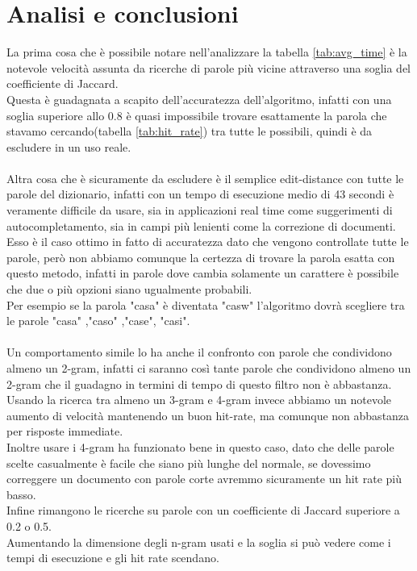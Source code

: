 \documentclass[]{article}
\begin{document}
\section{Analisi e conclusioni}
La prima cosa che è possibile notare nell'analizzare la tabella \ref{tab:avg_time} è la notevole velocità assunta da ricerche di parole più vicine attraverso una soglia del coefficiente di Jaccard.\\
Questa è guadagnata a scapito dell'accuratezza dell'algoritmo, infatti con una soglia superiore allo 0.8 è quasi impossibile trovare esattamente la parola che stavamo cercando(tabella \ref{tab:hit_rate}) tra tutte le possibili, quindi è da escludere in un uso reale.\\\\
Altra cosa che è sicuramente da escludere è il semplice edit-distance con tutte le parole del dizionario, infatti con un tempo di esecuzione medio di 43 secondi è veramente difficile da usare, sia in applicazioni real time come suggerimenti di autocompletamento, sia in campi più lenienti come la correzione di documenti.\\
Esso è il caso ottimo in fatto di accuratezza dato che vengono controllate tutte le parole, però non abbiamo comunque la certezza di trovare la parola esatta con questo metodo, infatti in parole dove cambia solamente un carattere è possibile che due o più opzioni siano ugualmente probabili.\\
Per esempio se la parola "casa" è diventata "casw" l'algoritmo dovrà scegliere tra le parole "casa" ,"caso" ,"case", "casi".\\\\
Un comportamento simile lo ha anche il confronto con parole che condividono almeno un 2-gram, infatti ci saranno così tante parole che condividono almeno un 2-gram che il guadagno in termini di tempo di questo filtro non è abbastanza.
Usando la ricerca tra almeno un 3-gram e 4-gram invece abbiamo un notevole aumento di velocità mantenendo un buon hit-rate, ma comunque non abbastanza per risposte immediate.\\
Inoltre usare i 4-gram ha funzionato bene in questo caso, dato che delle parole scelte casualmente è facile che siano più lunghe del normale, se dovessimo correggere un documento con parole corte avremmo sicuramente un hit rate più basso.\\
Infine rimangono le ricerche su parole con un coefficiente di Jaccard superiore a 0.2 o 0.5.\\
Aumentando la dimensione degli n-gram usati e la soglia si può vedere come i tempi di esecuzione e gli hit rate scendano.\\\\
\end{document}
